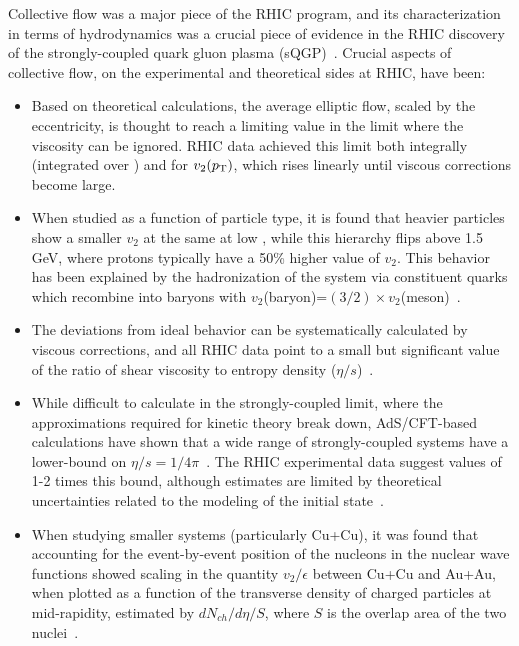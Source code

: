 Collective flow was a major piece of the RHIC program, and its characterization
in terms of hydrodynamics was a crucial piece of evidence in the RHIC discovery
of the strongly-coupled quark gluon plasma (sQGP)~\cite{Back:2004je,Adcox:2004mh,Adams:2005dq,Arsene:2004fa}.  
Crucial aspects of collective
flow, on the experimental and theoretical sides at RHIC, have been:
\begin{itemize}
\item Based on theoretical calculations, the average elliptic flow, scaled by the eccentricity,
is thought to reach a limiting value in the limit where
the viscosity can be ignored.  RHIC data achieved this limit both integrally (integrated over \pT)
and for $v_2(\mbox{$p_{\mathrm{T}}$})$, which rises linearly until viscous corrections become large.
\item When studied as a function of particle type, it is found that heavier particles show
a smaller $v_2$ at the same \pT at low \pT, while this hierarchy flips above 1.5 GeV, where protons
typically have a 50\% higher value of $v_2$.  This behavior has been explained by the hadronization of
the system via constituent quarks which recombine into baryons with $v_2$(baryon)=$(3/2) \times v_2$(meson)~\cite{Adare:2006ti,Fries:2003vb}.
\item The deviations from ideal behavior can be systematically calculated by viscous corrections, and
all RHIC data point to a small but significant value of the ratio of shear viscosity to entropy density ($\eta/s$)~\cite{Luzum:2008cw}.
\item While difficult to calculate in the strongly-coupled limit, where the approximations required for kinetic theory break down, AdS/CFT-based calculations have shown that a wide range of strongly-coupled systems have a lower-bound on
$\eta/s = 1/4\pi$~\cite{Kovtun:2004de}.  The RHIC experimental data suggest values of 1-2 times this bound, although estimates are limited
by theoretical uncertainties related to the modeling of the initial state~\cite{Luzum:2008cw}.
\item When studying smaller systems (particularly Cu+Cu), it was found that accounting for the event-by-event position of the nucleons in the nuclear wave functions showed scaling in the quantity $v_2/\epsilon$ between Cu+Cu and Au+Au, when
plotted as a function of the transverse density of charged particles at mid-rapidity, estimated by $dN_{ch}/d\eta/S$,
where $S$ is the overlap area of the two nuclei~\cite{Alver:2008zza}.
\end{itemize}

